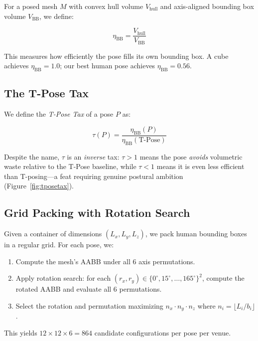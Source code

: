 \documentclass[11pt,letterpaper]{article}
\begin{document}
For a posed mesh $M$ with convex hull volume $V_{\text{hull}}$ and axis-aligned bounding box volume $V_{\text{BB}}$, we define:

\begin{equation}
    \eta_{\text{BB}} = \frac{V_{\text{hull}}}{V_{\text{BB}}}
\end{equation}

This measures how efficiently the pose fills its own bounding box. A cube achieves $\eta_{\text{BB}} = 1.0$; our best human pose achieves $\eta_{\text{BB}} = 0.56$.

\subsection{The T-Pose Tax}

We define the \emph{T-Pose Tax} of a pose $P$ as:

\begin{equation}
    \tau(P) = \frac{\eta_{\text{BB}}(P)}{\eta_{\text{BB}}(\text{T-Pose})}
\end{equation}

Despite the name, $\tau$ is an \emph{inverse} tax: $\tau > 1$ means the pose \emph{avoids} volumetric waste relative to the T-Pose baseline, while $\tau < 1$ means it is even less efficient than T-posing---a feat requiring genuine postural ambition (Figure~\ref{fig:tposetax}).

\subsection{Grid Packing with Rotation Search}

Given a container of dimensions $(L_x, L_y, L_z)$, we pack human bounding boxes in a regular grid. For each pose, we:

\begin{enumerate}
    \item Compute the mesh's AABB under all 6 axis permutations.
    \item Apply rotation search: for each $(r_x, r_y) \in \{0^\circ, 15^\circ, \ldots, 165^\circ\}^2$, compute the rotated AABB and evaluate all 6 permutations.
    \item Select the rotation and permutation maximizing $n_x \cdot n_y \cdot n_z$ where $n_i = \lfloor L_i / b_i \rfloor$.
\end{enumerate}

This yields $12 \times 12 \times 6 = 864$ candidate configurations per pose per venue.
\end{document}
